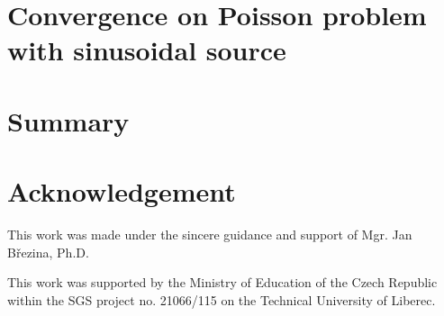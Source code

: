 \documentclass[preprint,12pt,authoryear]{elsarticle}
\begin{document}
\section{Convergence on Poisson problem with sinusoidal source}

\section{Summary}
\label{sec:summary}

\section{Acknowledgement}
This work was made under the sincere guidance and support of Mgr. Jan B{\v r}ezina, Ph.D.

This work was supported by the Ministry of Education of the Czech Republic within the SGS project 
no. 21066/115 on the Technical University of Liberec.





% 
% 
% 
  
 
\end{document}
